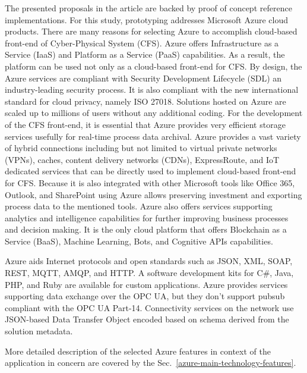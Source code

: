 \documentclass{jacsart}
\begin{document}
The presented proposals in the article are backed by proof of concept
reference implementations. For this study, prototyping addresses
Microsoft Azure cloud products. There are many reasons for selecting
Azure to accomplish cloud-based front-end of Cyber-Physical System (CFS). Azure offers
Infrastructure as a Service (IaaS) and Platform as a Service (PaaS)
capabilities. As a result, the platform can be used not only as a
cloud-based front-end for CFS. By design, the Azure services are
compliant with Security Development Lifecycle (SDL) an industry-leading
security process. It is also compliant with the new international
standard for cloud privacy, namely ISO 27018. Solutions hosted on Azure
are scaled up to millions of users without any additional coding. For
the development of the CFS front-end, it is essential that Azure
provides very efficient storage services usefully for real-time process
data archival. Azure provides a vast variety of hybrid connections
including but not limited to virtual private networks (VPNs), caches,
content delivery networks (CDNs), ExpressRoute, and IoT dedicated
services that can be directly used to implement cloud-based front-end
for CFS. Because it is also integrated with other Microsoft tools like
Office 365, Outlook, and SharePoint using Azure allows preserving
investment and exporting process data to the mentioned tools. Azure also
offers services supporting analytics and intelligence capabilities for
further improving business processes and decision making. It is the only
cloud platform that offers Blockchain as a Service (BaaS), Machine
Learning, Bots, and Cognitive APIs capabilities.

Azure aids Internet protocols and open standards such as JSON, XML,
SOAP, REST, MQTT, AMQP, and HTTP. A software development kits for C\#,
Java, PHP, and Ruby are available for custom applications. Azure
provides services supporting data exchange over the OPC UA, but they
don't support pubsub compliant with the OPC UA Part-14. Connectivity
services on the network use JSON-based Data Transfer Object encoded
based on schema derived from the solution metadata.

More detailed description of the selected Azure features in context of the application in concern are covered by the Sec.~\ref*{azure-main-technology-features}.
\end{document}
